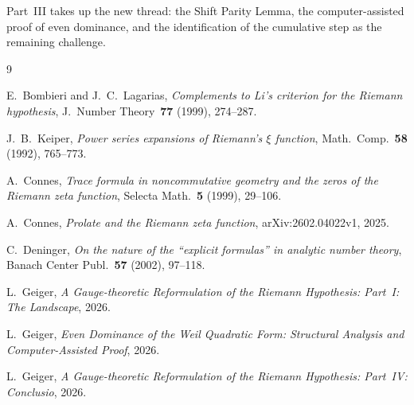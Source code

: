 \documentclass[12pt,a4paper]{article}
\theoremstyle{definition}
\theoremstyle{remark}
\begin{document}
Part~III takes up the new thread: the Shift Parity Lemma, the computer-assisted proof of even dominance, and the identification of the cumulative step as the remaining challenge.


\begin{thebibliography}{9}

E.~Bombieri and J.~C.~Lagarias, \emph{Complements to Li's criterion for the Riemann hypothesis}, J.~Number Theory~\textbf{77} (1999), 274--287.

J.~B.~Keiper, \emph{Power series expansions of Riemann's $\xi$ function}, Math.~Comp.~\textbf{58} (1992), 765--773.

A.~Connes, \emph{Trace formula in noncommutative geometry and the zeros of the Riemann zeta function}, Selecta Math.~\textbf{5} (1999), 29--106.

A.~Connes, \emph{Prolate and the Riemann zeta function}, arXiv:2602.04022v1, 2025.

C.~Deninger, \emph{On the nature of the ``explicit formulas'' in analytic number theory}, Banach Center Publ.~\textbf{57} (2002), 97--118.

L.~Geiger, \emph{A Gauge-theoretic Reformulation of the Riemann Hypothesis: Part~I: The Landscape}, 2026.

L.~Geiger, \emph{Even Dominance of the Weil Quadratic Form: Structural Analysis and Computer-Assisted Proof}, 2026.

L.~Geiger, \emph{A Gauge-theoretic Reformulation of the Riemann Hypothesis: Part~IV: Conclusio}, 2026.

\end{thebibliography}
\end{document}
